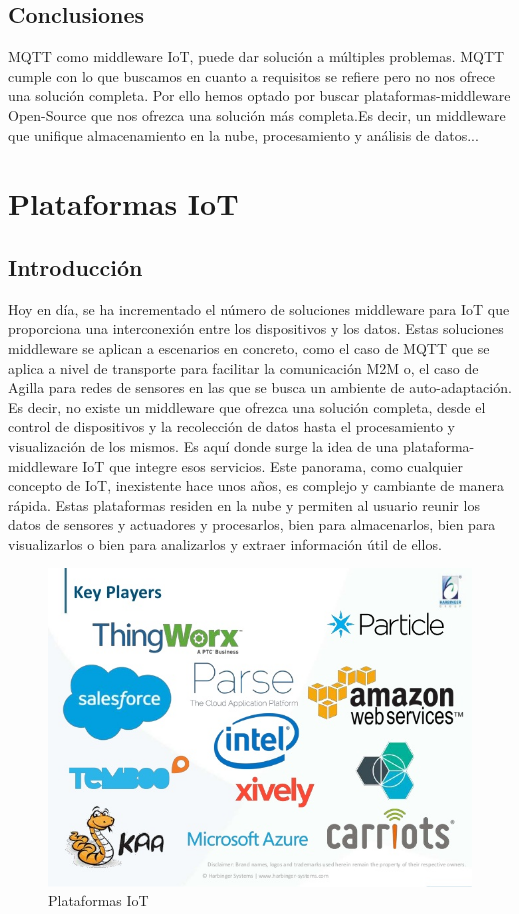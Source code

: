 \documentclass[12pt, twoside]{book}
\begin{document}
\section{Conclusiones}
MQTT como middleware IoT, puede dar solución a múltiples problemas. MQTT cumple con lo que buscamos en cuanto a requisitos se refiere pero no nos ofrece una solución completa. Por ello hemos optado por buscar plataformas-middleware Open-Source que nos ofrezca una solución más completa.Es decir, un middleware que unifique almacenamiento en la nube, procesamiento y análisis de datos...

\chapter{Plataformas IoT}
\section{Introducción}
Hoy en día, se ha incrementado el número de soluciones middleware para IoT que proporciona una interconexión entre los dispositivos y los datos. Estas soluciones middleware se aplican a escenarios en concreto, como el caso de MQTT que se aplica a nivel de transporte para facilitar la comunicación M2M o, el caso de Agilla para redes de sensores en las que se busca un ambiente de auto-adaptación. Es decir, no existe un middleware que ofrezca una solución completa, desde el control de dispositivos  y la recolección de datos hasta el procesamiento y visualización de los mismos. Es aquí donde surge la idea de una plataforma-middleware IoT\cite{platform_gap} que integre esos servicios. Este panorama, como cualquier concepto de IoT, inexistente hace unos años, es complejo y cambiante de manera rápida. Estas plataformas residen en la nube y permiten al usuario reunir los datos de sensores y actuadores y procesarlos, bien para almacenarlos, bien para visualizarlos o bien para analizarlos y extraer información útil de ellos.
\begin{figure}[H]
\centering
\includegraphics[scale=0.3]{images/platforms_iot}
\caption{Plataformas IoT}\label{platforms_iot}
\end{figure}
\end{document}
